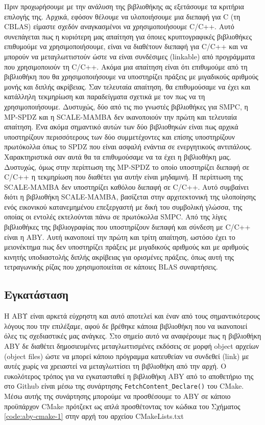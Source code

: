 Πριν προχωρήσουμε με την ανάλυση της βιβλιοθήκης ας εξετάσουμε τα κριτήρια επιλογής της. Αρχικά, εφόσον θέλουμε να υλοποιήσουμε μια διεπαφή για C (τη CBLAS) είμαστε σχεδόν αναγκασμένοι να χρησιμοποιήσουμε C/C++. Αυτό συνεπάγεται πως η κυριότερη μας απαίτηση για όποιες κρυπτογραφικές βιβλιοθήκες επιθυμούμε να χρησιμοποιήσουμε, είναι να διαθέτουν διεπαφή για C/C++ και να μπορούν να μεταγλωττιστούν ώστε να είναι συνδέσιμες (linkable) από προγράμματα που χρησιμοποιούν τη C/C++. Ακόμα μια απαίτηση είναι ότι επιθυμούμε από τη βιβλιοθήκη που θα χρησιμοποιήσουμε να υποστηρίζει πράξεις με μιγαδικούς αριθμούς μονής και διπλής ακρίβειας. Σαν τελευταία απαίτηση, θα επιθυμούσαμε να έχει και κατάλληλη τεκμηρίωση και παραδείγματα σχετικά με τον πως να τη χρησιμοποιήσουμε. Δυστυχώς, δύο από τις πιο γνωστές βιβλιοθήκες για SMPC, η MP-SPDZ και η SCALE-MAMBA δεν ικανοποιούν την πρώτη και τελευταία απαίτηση. Ένα ακόμα σημαντικό αυτών των δύο βιβλιοθηκών είναι πως αρχικά υποστηρίζουν περισσότερους των δύο συμμετέχοντες και επίσης υποστηρίζουν πρωτόκολλα όπως το SPDZ που είναι ασφαλή ενάντια σε ενεργητικούς αντιπάλους. Χαρακτηριστικά σαν αυτά θα τα επιθυμούσαμε να τα έχει η βιβλιοθήκη μας. Δυστυχώς, όμως στην περίπτωση της MP-SPDZ το οποίο υποστηρίζει διεπαφή σε C/C++ η τεκμηρίωση που διαθέτει για αυτήν είναι μηδαμινή. Η περίπτωση της SCALE-MAMBA δεν υποστηρίζει καθόλου διεπαφή σε C/C++. Αυτό συμβαίνει διότι η βιβλιοθήκη SCALE-MAMBA, βασίζεται στην αρχιτεκτονική της υλοποίησης ενός εικονικού κατανεμημένου επεξεργαστή με δική του συμβολική γλώσσα, της οποίας οι εντολές εκτελούνται πάνω σε πρωτόκολλα SMPC. Από της λίγες βιβλιοθήκες της βιβλιογραφίας που υποστηρίζουν διεπαφή και σύνδεση με C/C++ είναι η ABY. Αυτή ικανοποιεί την πρώτη και τρίτη απαίτηση, ωστόσο έχει το μειονέκτημα πως δεν υποστηρίζει πράξεις με μιγαδικούς αριθμούς και με αριθμούς κινητής υποδιαστολής διπλής ακρίβειας για ορισμένες πράξεις, όπως αυτή της τετραγωνικής ρίζας που χρησιμοποιείται σε κάποιες BLAS συναρτήσεις.

\subsection{Εγκατάσταση}

H ΑΒΥ είναι αρκετά εύχρηστη και αυτό αποτελεί και έναν από τους σημαντικότερους λόγους που την επιλέξαμε, αφού δε βρέθηκε κάποια βιβλιοθήκη που να ικανοποιεί όλες τις σχεδιαστικές μας ανάγκες. Στο σημείο αυτό να αναφέρουμε πως η βιβλιοθήκη ABY δε διαθέτει δημοσιευμένες μεταγλωττισμένες εκδόσεις σε μορφή object αρχείων (object files) ώστε να μπορεί κάποιο πρόγραμμα κατευθείαν να συνδεθεί (link) με αυτές χωρίς να χρειαστεί να μεταγλωττίσει τη βιβλιοθήκη από την αρχή. Ο ευκολότερος τρόπος για να εγκατασταθεί η βιβλιοθήκη ABY από το αποθετήριο της στο Github είναι μέσω της συνάρτησης \texttt{FetchContent_Declare()} του CMake. Μέσω αυτής της συνάρτησης μπορούμε να προσθέσουμε το ABY σε κάποιο προϋπάρχον CMake πρότζεκτ ως απλά προσθέτοντας τον κώδικα του Σχήματος \ref{code:aby-cmake-1} στην αρχή του αρχείου CMakeLists.txt

